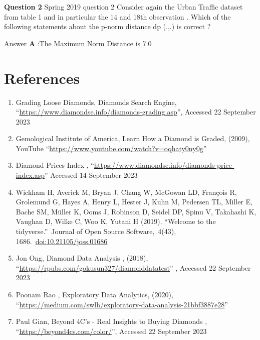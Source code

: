 \documentclass[
]{article}
\begin{document}
\textbf{Question 2} \textbar{} Spring 2019 question 2 Consider again the
Urban Traffic dataset from table 1 and in particular the 14 and 18th
observation . Which of the following statements about the p-norm
distance dp (.,.) is correct ?

Answer \textbf{A} :The Maximum Norm Distance is 7.0

\hypertarget{references}{%
\section{References}\label{references}}

\begin{enumerate}
\def\labelenumi{\arabic{enumi})}
\item
  Grading Loose Diamonds, Diamonds Search Engine,
  ``\url{https://www.diamondse.info/diamonds-grading.asp}'', Accessed 22
  September 2023
\item
  Gemological Institute of America, Learn How a Diamond is Graded,
  (2009), YouTube ``\url{https://www.youtube.com/watch?v=oqhaty0ny0g}''
\item
  Diamond Prices Index ,
  ``\url{https://www.diamondse.info/diamonds-price-index.asp}'' Accessed
  14 September 2023
\item
  Wickham H, Averick M, Bryan J, Chang W, McGowan LD, François R,
  Grolemund G, Hayes A, Henry L, Hester J, Kuhn M, Pedersen TL, Miller
  E, Bache SM, Müller K, Ooms J, Robinson D, Seidel DP, Spinu V,
  Takahashi K, Vaughan D, Wilke C, Woo K, Yutani H (2019). ``Welcome to
  the tidyverse.''~Journal of Open Source Software,~4(43),
  1686.~\url{doi:10.21105/joss.01686}
\item
  Jon Ong, Diamond Data Analysis , (2018),
  ``\url{https://rpubs.com/gokusun327/diamonddatatest}'' , Accessed 22
  September 2023
\item
  Poonam Rao , Exploratory Data Analytics, (2020),
  ``\url{https://medium.com/swlh/exploratory-data-analysis-21bbf3887e28}''
\item
  Paul Gian, Beyond 4C's - Real Insights to Buying Diamonds ,
  ``\url{https://beyond4cs.com/color/}'', Accessed 22 September 2023
\end{enumerate}
\end{document}
